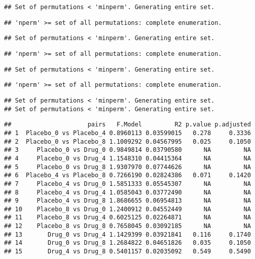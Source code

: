 \documentclass[]{article}
\begin{document}
\begin{verbatim}
## Set of permutations < 'minperm'. Generating entire set.
\end{verbatim}

\begin{verbatim}
## 'nperm' >= set of all permutations: complete enumeration.
\end{verbatim}

\begin{verbatim}
## Set of permutations < 'minperm'. Generating entire set.
\end{verbatim}

\begin{verbatim}
## 'nperm' >= set of all permutations: complete enumeration.
\end{verbatim}

\begin{verbatim}
## Set of permutations < 'minperm'. Generating entire set.
\end{verbatim}

\begin{verbatim}
## 'nperm' >= set of all permutations: complete enumeration.
\end{verbatim}

\begin{verbatim}
## Set of permutations < 'minperm'. Generating entire set.
## Set of permutations < 'minperm'. Generating entire set.
\end{verbatim}

\begin{verbatim}
##                     pairs   F.Model         R2 p.value p.adjusted
## 1  Placebo_0 vs Placebo_4 0.8960113 0.03599015   0.278     0.3336
## 2  Placebo_0 vs Placebo_8 1.1009292 0.04567995   0.025     0.1050
## 3     Placebo_0 vs Drug_0 0.9849814 0.03790580      NA         NA
## 4     Placebo_0 vs Drug_4 1.1548310 0.04415364      NA         NA
## 5     Placebo_0 vs Drug_8 1.9307970 0.07744626      NA         NA
## 6  Placebo_4 vs Placebo_8 0.7266190 0.02824386   0.071     0.1420
## 7     Placebo_4 vs Drug_0 1.5851333 0.05545307      NA         NA
## 8     Placebo_4 vs Drug_4 1.0585043 0.03772490      NA         NA
## 9     Placebo_4 vs Drug_8 1.8686655 0.06954813      NA         NA
## 10    Placebo_8 vs Drug_0 1.2400912 0.04552449      NA         NA
## 11    Placebo_8 vs Drug_4 0.6025125 0.02264871      NA         NA
## 12    Placebo_8 vs Drug_8 0.7658045 0.03092185      NA         NA
## 13       Drug_0 vs Drug_4 1.1429399 0.03921841   0.116     0.1740
## 14       Drug_0 vs Drug_8 1.2684822 0.04651826   0.035     0.1050
## 15       Drug_4 vs Drug_8 0.5401157 0.02035092   0.549     0.5490
\end{verbatim}
\end{document}
